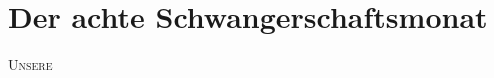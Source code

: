 

\chapter*{Der achte Schwangerschaftsmonat}

\lettrine[lines=2, loversize=0.3, lraise=0]{\initfamily U}{nsere}
